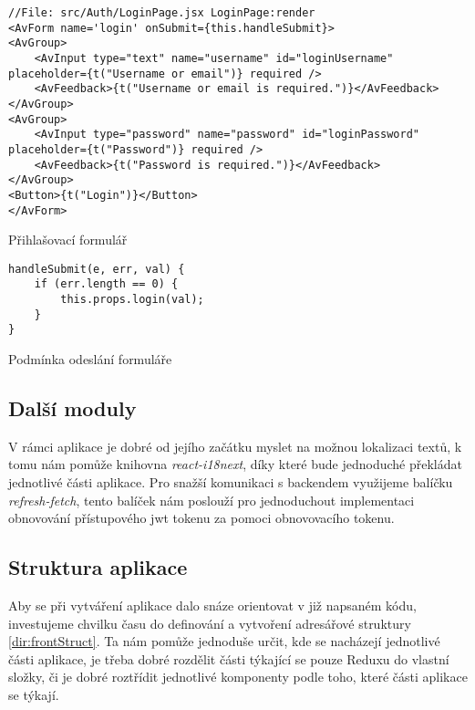 \begin{listing}[H]
    \begin{verbatim}
//File: src/Auth/LoginPage.jsx LoginPage:render
<AvForm name='login' onSubmit={this.handleSubmit}>
<AvGroup>
    <AvInput type="text" name="username" id="loginUsername" placeholder={t("Username or email")} required />
    <AvFeedback>{t("Username or email is required.")}</AvFeedback>
</AvGroup>
<AvGroup>
    <AvInput type="password" name="password" id="loginPassword" placeholder={t("Password")} required />
    <AvFeedback>{t("Password is required.")}</AvFeedback>
</AvGroup>
<Button>{t("Login")}</Button>
</AvForm>
    \end{verbatim}
    \caption{Přihlašovací formulář}
    \label{lst:loginForm}
\end{listing}

\begin{listing}[H]
    \begin{verbatim}
handleSubmit(e, err, val) {
    if (err.length == 0) {
        this.props.login(val);
    }
}
    \end{verbatim}
    \caption{Podmínka odeslání formuláře}
    \label{lst:conditionForm}
\end{listing}

\subsection{Další moduly}

V rámci aplikace je dobré od jejího začátku myslet na možnou lokalizaci textů, k tomu nám pomůže knihovna \textit{react-i18next}, díky které bude jednoduché překládat
jednotlivé části aplikace. Pro snažší komunikaci s backendem využijeme balíčku \textit{refresh-fetch}, tento balíček nám poslouží pro jednoduchout implementaci obnovování přístupového
\gls{jwt} tokenu za pomoci obnovovacího tokenu.

\subsection{Struktura aplikace}

Aby se při vytváření aplikace dalo snáze orientovat v již napsaném kódu, investujeme chvilku času do definování a vytvoření adresářové struktury \ref{dir:frontStruct}. Ta nám
pomůže jednoduše určit, kde se nacházejí jednotlivé části aplikace, je třeba dobré rozdělit části týkající se pouze Reduxu do vlastní složky, či je dobré roztřídit
jednotlivé komponenty podle toho, které části aplikace se týkají.

